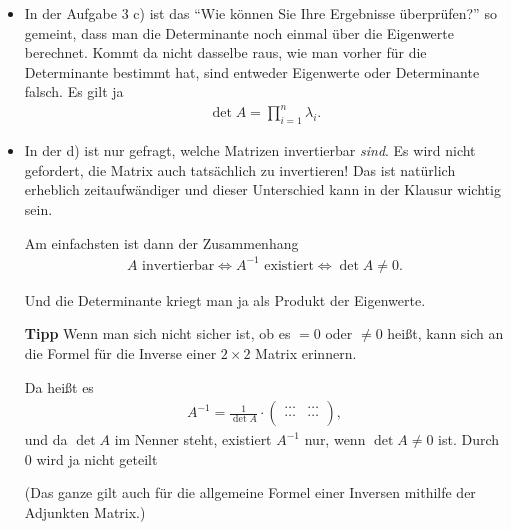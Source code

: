 \documentclass[11pt, a4paper]{article}
\begin{document}
\begin{itemize}
\item In der Aufgabe 3 c) ist das \enquote{Wie können Sie Ihre Ergebnisse überprüfen?} so gemeint, dass man die Determinante noch einmal über die Eigenwerte berechnet. Kommt da nicht dasselbe raus, wie man vorher für die Determinante bestimmt hat, sind entweder Eigenwerte oder Determinante falsch. Es gilt ja
\begin{align*}
\det A = \prod_{i=1}^n \lambda_i.
\end{align*}

\item In der d) ist nur gefragt, welche Matrizen invertierbar \emph{sind}. Es wird nicht gefordert, die Matrix auch tatsächlich zu invertieren! Das ist natürlich erheblich zeitaufwändiger und dieser Unterschied kann in der Klausur wichtig sein. 

Am einfachsten ist dann der Zusammenhang 
\begin{align*}
A \text{~invertierbar} \Leftrightarrow A^{-1} \text{~existiert} \Leftrightarrow \det A \neq 0.
\end{align*}

Und die Determinante kriegt man ja als Produkt der Eigenwerte. 

\textbf{Tipp} Wenn man sich nicht sicher ist, ob es $= 0$ oder $\neq 0$ heißt, kann sich an die Formel für die Inverse einer $2 \times 2$ Matrix erinnern.

Da heißt es
\begin{align*}
A^{-1} = \frac{1}{\det A} \cdot 
\left(
\begin{array}{cc}
\dots & \dots\\ 
\dots & \dots\\
\end{array}
\right),
\end{align*}
und da $\det A$ im Nenner steht, existiert $A^{-1}$ nur, wenn $\det A \neq 0$ ist. Durch $0$ wird ja nicht geteilt \smiley{}

(Das ganze gilt auch für die allgemeine Formel einer Inversen mithilfe der Adjunkten Matrix.)
\end{itemize}








\newpage
\end{document}
